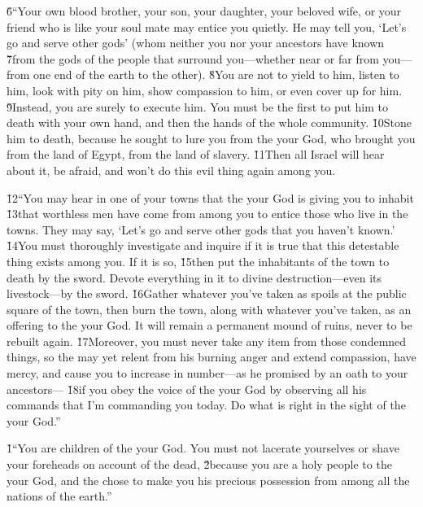 \v{6}``Your own blood brother, your son, your daughter, your beloved wife, or your friend who is like your soul mate may entice you quietly. He may tell you, `Let's go and serve other gods' (whom neither you nor your ancestors have known \v{7}from the gods of the people that surround you---whether near or far from you---from one end of the earth to the other). \v{8}You are not to yield to him, listen to him, look with pity on him, show compassion to him, or even cover up for him. \v{9}Instead, you are surely to execute him. You must be the first to put him to death with your own hand, and then the hands of the whole community. \v{10}Stone him to death, because he sought to lure you from the  your God, who brought you from the land of Egypt, from the land of slavery. \v{11}Then all Israel will hear about it, be afraid, and won't do this evil thing again among you.

\v{12}``You may hear in one of your towns that the  your God is giving you to inhabit \v{13}that worthless men have come from among you to entice those who live in the towns. They may say, `Let's go and serve other gods that you haven't known.' \v{14}You must thoroughly investigate and inquire if it is true that this detestable thing exists among you. If it is so, \v{15}then put the inhabitants of the town to death by the sword. Devote everything in it to divine destruction---even its livestock---by the sword. \v{16}Gather whatever you've taken as spoils at the public square of the town, then burn the town, along with whatever you've taken, as an offering to the  your God. It will remain a permanent mound of ruins, never to be rebuilt again. \v{17}Moreover, you must never take any item from those condemned things, so the  may yet relent from his burning anger and extend compassion, have mercy, and cause you to increase in number---as he promised by an oath to your ancestors--- \v{18}if you obey the voice of the  your God by observing all his commands that I'm commanding you today. Do what is right in the sight of the  your God.''

\v{1}``You are children of the  your God. You must not lacerate yourselves or shave your foreheads on account of the dead, \v{2}because you are a holy people to the  your God, and the  chose to make you his precious possession from among all the nations of the earth.''

